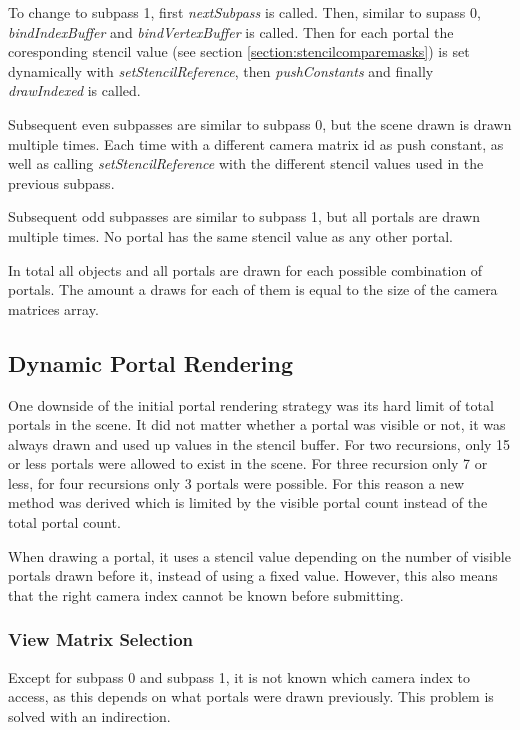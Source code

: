To change to subpass 1, first \textit{nextSubpass} is called. Then, similar to supass 0, \textit{bindIndexBuffer} and \textit{bindVertexBuffer} is called.  Then for each portal the coresponding stencil value (see section \ref{section:stencilcomparemasks}) is set dynamically with \textit{setStencilReference}, then \textit{pushConstants} and finally \textit{drawIndexed} is called.

Subsequent even subpasses are similar to subpass 0, but the scene drawn is drawn multiple times. Each time with a different camera matrix id as push constant, as well as calling \textit{setStencilReference} with the different stencil values used in the previous subpass.

Subsequent odd subpasses are similar to subpass 1, but all portals are drawn multiple times. No portal has the same stencil value as any other portal.

In total all objects and all portals are drawn for each possible combination of portals. The amount a draws for each of them is equal to the size of the camera matrices array.


\subsection{Dynamic Portal Rendering}
One downside of the initial portal rendering strategy was its hard limit of total portals in the scene. It did not matter whether a portal was visible or not, it was always drawn and used up values in the stencil buffer. For two recursions, only 15 or less portals were allowed to exist in the scene. For three recursion only 7 or less, for four recursions only 3 portals were possible. For this reason a new method was derived which is limited by the visible portal count instead of the total portal count. 

When drawing a portal, it uses a stencil value depending on the number of visible portals drawn before it, instead of using a fixed value. However, this also means that the right camera index cannot be known before submitting.


\subsubsection{View Matrix Selection}
\label{section:viewmatrixselection}
Except for subpass 0 and subpass 1, it is not known which camera index to access, as this depends on what portals were drawn previously. This problem is solved with an indirection.

